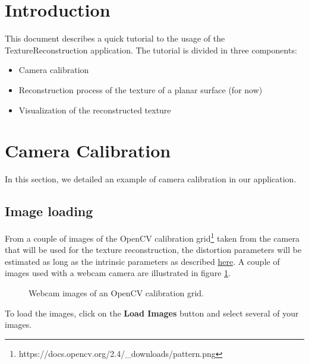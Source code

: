 \documentclass[12pt]{article}
\begin{document}
\maketitle

\section{Introduction}
This document describes a quick tutorial to the usage of the TextureReconstruction application.
The tutorial is divided in three components:
\begin{itemize}
    \item Camera calibration
    \item Reconstruction process of the texture of a planar surface (for now)
    \item Visualization of the reconstructed texture
\end{itemize}


\section{Camera Calibration}
\label{sec:calib}
In this section, we detailed an example of camera calibration in our application.
\subsection{Image loading}
From a couple of images of the OpenCV calibration grid\footnote{https://docs.opencv.org/2.4/\_downloads/pattern.png} taken from the camera that will be used for the texture reconstruction, the distortion parameters will be estimated as long as the intrinsic parameters as described 
\href{https://docs.opencv.org/2.4/doc/tutorials/calib3d/camera\_calibration/camera\_calibration.html}{here}. A couple of images used with a webcam camera are illustrated in figure \ref{fig:calib_webcam}.
\begin{figure}[!ht]
    \centering
\caption{Webcam images of an OpenCV calibration grid.}
\label{fig:calib_webcam}
\end{figure}
To load the images, click on the \textbf{Load Images} button and select several of your images. 
\end{document}
